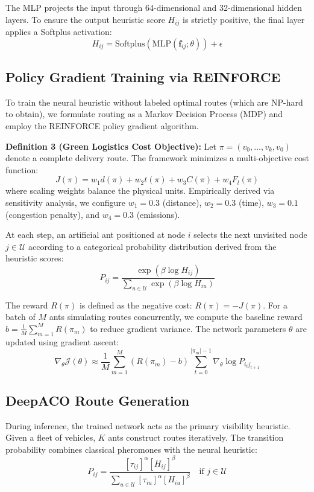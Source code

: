 \documentclass[conference]{IEEEtran}
\begin{document}
The MLP projects the input through 64-dimensional and 32-dimensional hidden layers. To ensure the output heuristic score $H_{ij}$ is strictly positive, the final layer applies a Softplus activation:
\begin{equation}
    H_{ij} = \text{Softplus}\left( \text{MLP}(\mathbf{f}_{ij}; \theta) \right) + \epsilon
\end{equation}

\subsection{Policy Gradient Training via REINFORCE}
To train the neural heuristic without labeled optimal routes (which are NP-hard to obtain), we formulate routing as a Markov Decision Process (MDP) and employ the REINFORCE policy gradient algorithm.

\textbf{Definition 3 (Green Logistics Cost Objective):} Let $\pi = (v_0, \dots, v_k, v_0)$ denote a complete delivery route. The framework minimizes a multi-objective cost function:
\begin{equation}
    J(\pi) = w_1 d(\pi) + w_2 t(\pi) + w_3 C(\pi) + w_4 F_{l}(\pi)
\end{equation}
where scaling weights balance the physical units. Empirically derived via sensitivity analysis, we configure $w_1=0.3$ (distance), $w_2=0.3$ (time), $w_3=0.1$ (congestion penalty), and $w_4=0.3$ (emissions).

At each step, an artificial ant positioned at node $i$ selects the next unvisited node $j \in \mathcal{U}$ according to a categorical probability distribution derived from the heuristic scores:
\begin{equation}
    P_{ij} = \frac{\exp(\beta \log H_{ij})}{\displaystyle \sum_{u \in \mathcal{U}} \exp(\beta \log H_{iu})}
\end{equation}

The reward $R(\pi)$ is defined as the negative cost: $R(\pi) = -J(\pi)$. For a batch of $M$ ants simulating routes concurrently, we compute the baseline reward $b = \frac{1}{M} \sum_{m=1}^{M} R(\pi_m)$ to reduce gradient variance. The network parameters $\theta$ are updated using gradient ascent:
\begin{equation}
    \nabla_\theta \mathcal{J}(\theta) \approx \frac{1}{M} \sum_{m=1}^{M} \left( R(\pi_m) - b \right) \sum_{t=0}^{|\pi_m|-1} \nabla_\theta \log P_{i_t j_{t+1}}
\end{equation}

\subsection{DeepACO Route Generation}
During inference, the trained network acts as the primary visibility heuristic. Given a fleet of vehicles, $K$ ants construct routes iteratively. The transition probability combines classical pheromones with the neural heuristic:
\begin{equation}
    P_{ij} = \frac{[\tau_{ij}]^\alpha [H_{ij}]^\beta}{\displaystyle \sum_{u \in \mathcal{U}} [\tau_{iu}]^\alpha [H_{iu}]^\beta} \quad \text{if } j \in \mathcal{U}
\end{equation}
\end{document}
